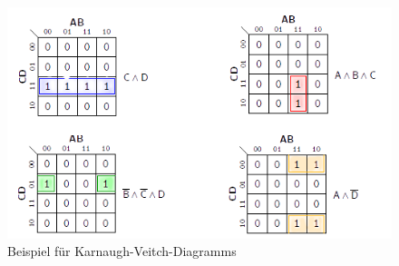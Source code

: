 \documentclass[12pt]{report}
\begin{document}
\begin{figure}[h]
  \caption{Beispiel für Karnaugh-Veitch-Diagramms}
  \centering
  \includegraphics[width=\textwidth]{karnaugh-veitch-example01}
\end{figure}
\end{document}

